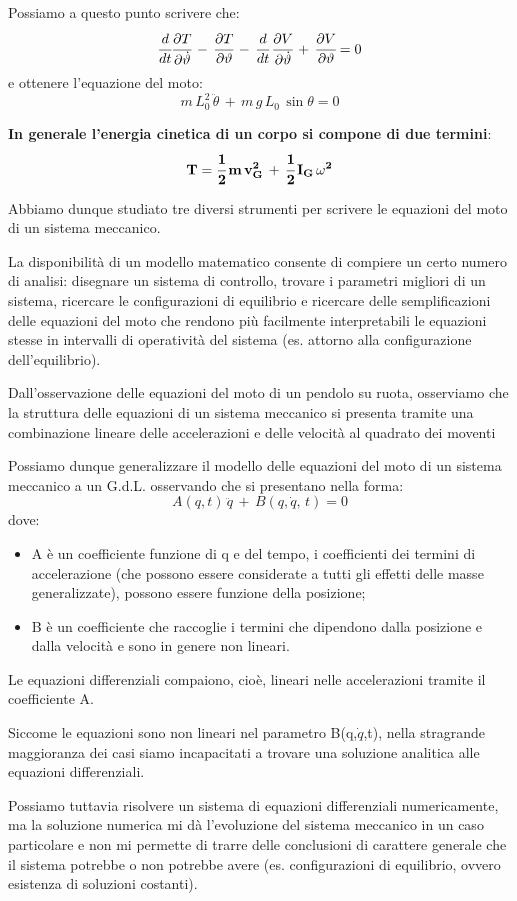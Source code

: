 Possiamo a questo punto scrivere che:
\[\cfrac{d}{dt}\cfrac{\partial T}{\partial\dot{\vartheta}}\,-\,\cfrac{\partial T}{\partial\vartheta}\,-\,\cfrac{d}{dt}\,\cfrac{\partial V}{\partial\dot{\vartheta}}\,+\,\cfrac{\partial V}{\partial\vartheta} = 0\]
e ottenere l'equazione del moto:
\[m\,L_0^2\,\ddot{\theta}\,+\,m\,g\,L_0\,\sin{\theta} = 0\]


\textbf{In generale l'energia cinetica di un corpo si compone di due termini}:
\[\mathbf{T = \cfrac{1}{2}\,m\,v_G^2\,+\,\cfrac{1}{2}\,I_G\,\omega^2}\]


Abbiamo dunque studiato tre diversi strumenti per scrivere le equazioni del moto di un sistema meccanico.

La disponibilità di un modello matematico consente di compiere un certo numero di analisi: disegnare un sistema di controllo, trovare i parametri migliori di un sistema, ricercare le configurazioni di equilibrio e ricercare delle semplificazioni delle equazioni del moto che rendono più facilmente interpretabili le equazioni stesse in intervalli di operatività del sistema (es. attorno alla configurazione dell'equilibrio).

Dall'osservazione delle equazioni del moto di un pendolo su ruota, osserviamo che la struttura delle equazioni di un sistema meccanico si presenta tramite una combinazione lineare delle accelerazioni e delle velocità al quadrato dei moventi 

Possiamo dunque generalizzare il modello delle equazioni del moto di un sistema meccanico a un G.d.L. osservando che si presentano nella forma:
\[A(q,t)\,\ddot{q}\,+\,B(q,\dot{q},\,t)=0\]
dove:
\begin{itemize}
\item A è un coefficiente funzione di q e del tempo, i coefficienti dei termini di accelerazione (che possono essere considerate a tutti gli effetti delle masse generalizzate), possono essere funzione della posizione;
\item B è un coefficiente che raccoglie i termini che dipendono dalla posizione e dalla velocità e sono in genere non lineari.
\end{itemize}

Le equazioni differenziali compaiono, cioè, lineari nelle accelerazioni tramite il coefficiente A.

Siccome le equazioni sono non lineari nel parametro B(q,$\dot{q}$,t), nella stragrande maggioranza dei casi siamo incapacitati a trovare una soluzione analitica alle equazioni differenziali.

Possiamo tuttavia risolvere un sistema di equazioni differenziali numericamente, ma la soluzione numerica mi dà l'evoluzione del sistema meccanico in un caso particolare e non mi permette di trarre delle conclusioni di carattere generale che il sistema potrebbe o non potrebbe avere (es. configurazioni di equilibrio, ovvero esistenza di soluzioni costanti).

